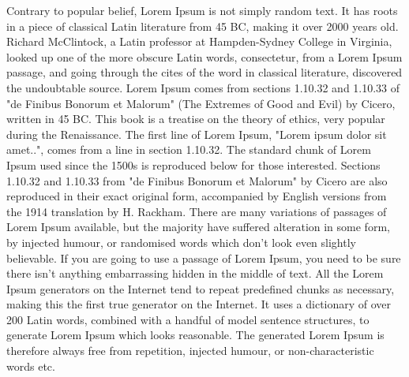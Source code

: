\documentclass[]{article}
\begin{document}
Contrary to popular belief, Lorem Ipsum is not simply random text. It has roots in a piece of \cite{lamport94}classical Latin literature from 45 BC, making it over 2000 years old. Richard McClintock, a Latin professor at Hampden-Sydney College in Virginia, looked up one of the more obscure Latin words, consectetur, from a Lorem Ipsum passage, and going through the cites of the word in classical literature, discovered the undoubtable source. Lorem Ipsum comes from sections 1.10.32 and 1.10.33 of "de Finibus Bonorum et Malorum" (The Extremes of Good and Evil) by Cicero, written in 45 BC. This book is a treatise on the theory of ethics, very popular during the Renaissance. The first line of Lorem Ipsum, "Lorem ipsum dolor sit amet..", comes from a line in section 1.10.32.
\onecolumn
The standard chunk of Lorem Ipsum used since the 1500s is reproduced below for those interested. Sections 1.10.32 and 1.10.33 from "de Finibus Bonorum et Malorum" by Cicero are also reproduced in their exact original form, accompanied by English versions from the 1914 translation by H. Rackham.
There are many variations of passages of Lorem Ipsum available, but the majority have suffered alteration in some form, by injected humour, or randomised words which don't look even slightly believable. If you are going to use a passage of Lorem Ipsum, you need to be sure there isn't anything embarrassing hidden in the middle of text. All the Lorem Ipsum generators on the Internet tend to repeat predefined chunks as necessary, making this the first true generator on the Internet. It uses a dictionary of over 200 Latin words, combined with a handful of model sentence structures, to generate Lorem Ipsum which looks reasonable. The generated Lorem Ipsum is therefore always free from repetition, injected humour, or non-characteristic words etc.\\
\end{document}
